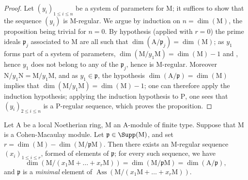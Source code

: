 \begin{proof}
Let $(y_i)_{1\leq i\leq n}$ be a system of parameters for $\mathrm{M}$; it suffices to show that the sequence $(y_i)$ is $\mathrm{M}$-regular.
We argue by induction on $n=\dim(\mathrm{M})$, the proposition being trivial for $n=0$.
By hypothesis (applied with $r=0$) the prime ideals $\mathfrak{p}_j$ associated to $\mathrm{M}$ are all such that $\dim(\mathrm{A}/\mathfrak{p}_j)=\dim(\mathrm{M})$; as $y_1$ forms part of a system of parameters, $\dim(\mathrm{M}/y_1\mathrm{M})=\dim(\mathrm{M})-1$  and , hence $y_1$ does not belong to any of the $\mathfrak{p}_j$, hence is $\mathrm{M}$-regular.
Moreover $\mathrm{N}/y_1\mathrm{N}=\mathrm{M}/y_1\mathrm{M}$, and as $y_1\in\mathfrak{p}$, the hypothesis $\dim(\mathrm{A}/\mathfrak{p})=\dim(\mathrm{M})$ implies that $\dim(\mathrm{M}/y_1\mathrm{M})=\dim(\mathrm{M})-1$; one can therefore apply the induction hypothesis; applying the induction hypothesis to $\mathrm{P}$, one sees that $(y_i)_{2\leq i\leq n}$ is a $\mathrm{P}$-regular sequence, which proves the proposition.
\end{proof}


\begin{proposition}[16.5.9]
\label{0.16.5.9}
Let $\mathrm{A}$ be a local Noetherian ring, $\mathrm{M}$ an $\mathrm{A}$-module of finite type.
Suppose that $\mathrm{M}$ is a Cohen-Macaulay module.
Let $\mathfrak{p}\in\Supp(\mathrm{M})$, and set $r=\dim(\mathrm{M})-\dim(\mathrm{M}/\mathfrak{p}\mathrm{M})$.
Then there exists an $\mathrm{M}$-regular sequence $(x_i)_{1\leq i\leq r}$, formed of elements of $\mathfrak{p}$; for every such sequence, we have
\[
  \dim(\mathrm{M}/(x_1\mathrm{M}+\ldots+x_r\mathrm{M}))=\dim(\mathrm{M}/\mathfrak{p}\mathrm{M})=\dim(\mathrm{A}/\mathfrak{p}),
\]
and $\mathfrak{p}$ is a \emph{minimal} element of $\operatorname{Ass}(\mathrm{M}/(x_1\mathrm{M}+\ldots+x_r\mathrm{M}))$.
\end{proposition}

